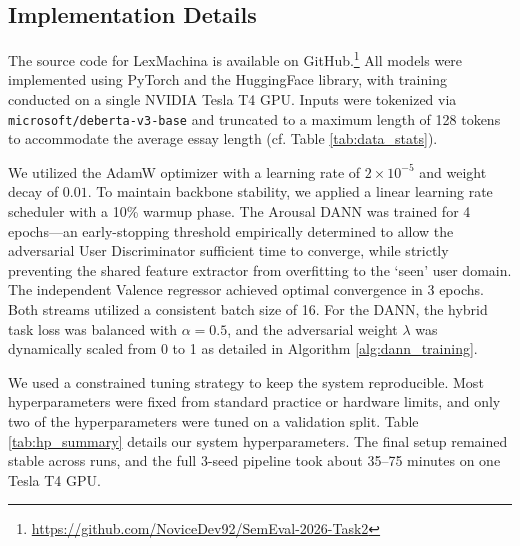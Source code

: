 \documentclass[11pt, a4paper]{article}
\begin{document}
\subsection{Implementation Details}
The source code for LexMachina is available on GitHub.\footnote{\url{https://github.com/NoviceDev92/SemEval-2026-Task2}} All models were implemented using PyTorch and the HuggingFace library, with training conducted on a single NVIDIA Tesla T4 GPU. Inputs were tokenized via \texttt{microsoft/deberta-v3-base} and truncated to a maximum length of 128 tokens to accommodate the average essay length (cf. Table \ref{tab:data_stats}). 

We utilized the AdamW optimizer with a learning rate of $2 \times 10^{-5}$ and weight decay of $0.01$. To maintain backbone stability, we applied a linear learning rate scheduler with a 10\% warmup phase. The Arousal DANN was trained for 4 epochs---an early-stopping threshold empirically determined to allow the adversarial User Discriminator sufficient time to converge, while strictly preventing the shared feature extractor from overfitting to the `seen' user domain. The independent Valence regressor achieved optimal convergence in 3 epochs. Both streams utilized a consistent batch size of 16. For the DANN, the hybrid task loss was balanced with $\alpha = 0.5$, and the adversarial weight $\lambda$ was dynamically scaled from 0 to 1 as detailed in Algorithm \ref{alg:dann_training}.

We used a constrained tuning strategy to keep the system reproducible. Most hyperparameters were fixed from standard practice or hardware limits, and only two of the hyperparameters were tuned on a validation split. Table \ref{tab:hp_summary} details our system hyperparameters. The final setup remained stable across runs, and the full 3-seed pipeline took about 35--75 minutes on one Tesla T4 GPU.
\end{document}
